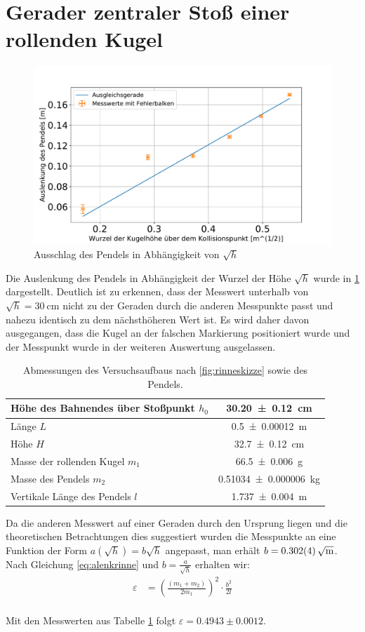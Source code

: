 \section[Rollende Kugel]{Gerader zentraler Stoß einer rollenden Kugel}



\begin{figure}[h!]
	\centering
	\includegraphics[width=0.7\linewidth]{res/Rinne}
	\caption{Ausschlag des Pendels in Abhängigkeit von $\sqrt{h}$}
	\label{fig:rinne}
\end{figure}

Die Auslenkung des Pendels in Abhängigkeit der Wurzel der Höhe $\sqrt{h}$ wurde in \cref{fig:rinne} dargestellt. Deutlich ist zu erkennen, dass der Messwert unterhalb von $\sqrt{h}=\SI{30}{\centi\metre}$ nicht zu der Geraden durch die anderen Messpunkte passt und nahezu identisch zu dem nächsthöheren Wert ist. Es wird daher davon ausgegangen, dass die Kugel an der falschen Markierung positioniert wurde und der Messpunkt wurde in der weiteren Auswertung ausgelassen.
\begin{table}
	\caption{Abmessungen des Versuchsaufbaus nach \cref{fig:rinneskizze} sowie des Pendels.}

\begin{tabular}{|l|c|}
	\hline 
	Höhe des Bahnendes über Stoßpunkt $h_0$ & \SI{30.20+-0.12}{cm}  \\ 
	\hline 
	Länge $L$ & \SI{0.5+-0.00012}{\metre}  \\ 
		\hline 
	Höhe $H$&  \SI{32.7+-0.12}{\centi \meter}\\ 
	\hline
	Masse der rollenden Kugel $m_1$& \SI{66.5 \pm 0.006}{\gram}  \\ 
	\hline 
	Masse des Pendels $m_2$ & \SI{0.51034+-0.000006}{\kilogram} \\  
	\hline
	Vertikale Länge des Pendels $l$ & \SI{1.737+-0.004}{\metre}  \\ 
	\hline 
\end{tabular} 
\label{tab:messwrinne}
\end{table}
Da die anderen Messwert auf einer Geraden durch den Ursprung liegen und die theoretischen Betrachtungen dies suggestiert wurden die Messpunkte an eine Funktion der Form $a(\sqrt{h})=b \sqrt{h}$ angepasst, man erhält $b=\SI{0.302+-0.004}{\sqrt{\metre}}$. Nach Gleichung \ref{eq:alenkrinne} und $b=\frac{a}{\sqrt{h}}$ erhalten wir:
\begin{align}
\varepsilon&=\left( \frac{(m_1+m_2)}{2m_1} \right) ^2 \cdot \frac{b^2}{2l}\\
\end{align}

Mit den Messwerten aus Tabelle \ref{tab:messwrinne} folgt $\varepsilon = 0.4943 \pm 0.0012$.














\newpage